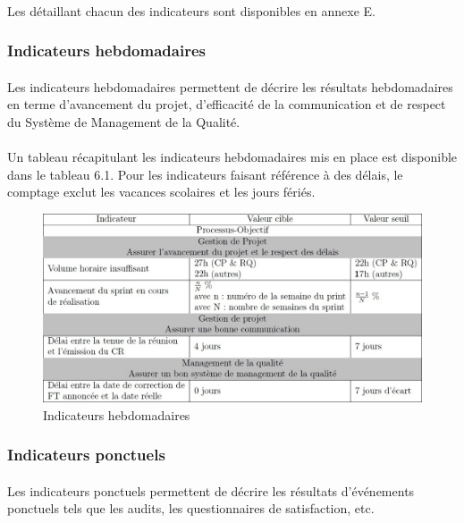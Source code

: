 \paragraph*{} Les \FII détaillant chacun des indicateurs sont disponibles en annexe E.

\subsubsection*{Indicateurs hebdomadaires}
\paragraph*{} Les indicateurs hebdomadaires permettent de décrire les résultats hebdomadaires en terme
d'avancement du projet, d'efficacité de la communication et de respect du Système de Management de la Qualité.

\paragraph*{} Un tableau récapitulant les indicateurs hebdomadaires mis en place est disponible dans le
tableau 6.1. Pour les indicateurs faisant référence à des délais, le comptage exclut les vacances
scolaires et les jours fériés.
\begin{figure}[h]
   \center
   \caption{\label{Tableau 6.1} Indicateurs hebdomadaires}
   \includegraphics[width=13cm]{./images/Indicateurs_hebdomadaires.jpg}
\end{figure}

\subsubsection*{Indicateurs ponctuels}

\paragraph*{} Les indicateurs ponctuels permettent de décrire les résultats d’événements ponctuels tels que les audits, les questionnaires de satisfaction, etc.

